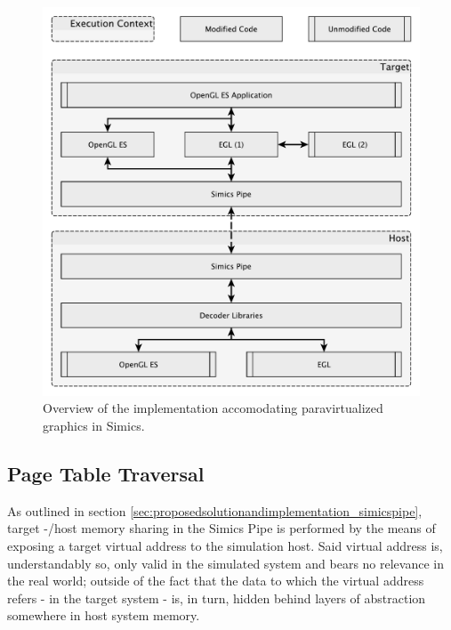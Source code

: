 \begin{figure}
\centering
\includegraphics[width=\linewidth]{img/yedoverview.pdf}
\caption[Paravirtualization implementation overview]{Overview of the implementation accomodating paravirtualized graphics in Simics.}
\label{fig:overview}
\end{figure}

\subsection{Page Table Traversal}
\label{sec:proposedsolutionandimplementation_pagetabletraversal}
As outlined in section \ref{sec:proposedsolutionandimplementation_simicspipe}, target -/host memory sharing in the Simics Pipe is performed by the means of exposing a target virtual address to the simulation host.
Said virtual address is, understandably so, only valid in the simulated system and bears no relevance in the real world; outside of the fact that the data to which the virtual address refers - in the target system - is, in turn, hidden behind layers of abstraction somewhere in host system memory.

